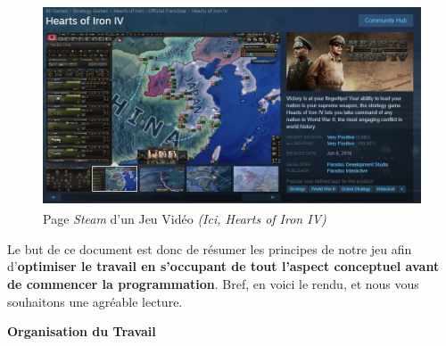 \documentclass{article}
\def\reg{\small{\textsuperscript{\textregistered}}}
\begin{document}
    \begin{figure}[h]
        \centering
            \includegraphics[scale=0.3]{image_steam_hoi.png}
            \caption{Page \textit{Steam\reg} d'un Jeu Vidéo \textit{(Ici, Hearts of Iron IV\reg)}}
            \label{fig:x photosysteme}
    \end{figure}

Le but de ce document est donc de résumer les principes de notre jeu afin d'\textbf{optimiser le travail en s'occupant de tout l'aspect conceptuel avant de commencer la programmation}. Bref, en voici le rendu, et nous vous souhaitons une agréable lecture.

\pagebreak

\Large \textbf{ Organisation du Travail} \\ \\
\large

\end{document}
